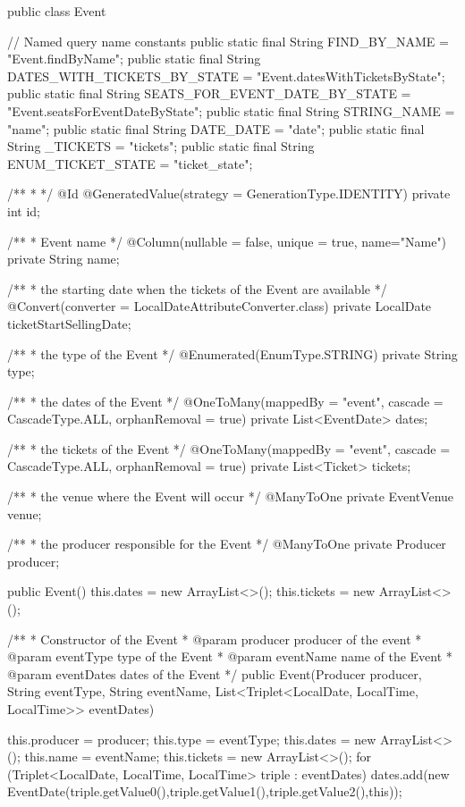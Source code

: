 \begin{prompt}
{{{  public class Event {
  
    // Named query name constants
    public static final String FIND_BY_NAME = "Event.findByName";
    public static final String DATES_WITH_TICKETS_BY_STATE = "Event.datesWithTicketsByState";
    public static final String SEATS_FOR_EVENT_DATE_BY_STATE = "Event.seatsForEventDateByState";
    public static final String STRING_NAME = "name";
    public static final String DATE_DATE = "date";
    public static final String _TICKETS = "tickets";
    public static final String ENUM_TICKET_STATE = "ticket_state";
  
    /**
     * 
     */
    @Id @GeneratedValue(strategy = GenerationType.IDENTITY)
    private int id;
  
    /**
     * Event name
     */
    @Column(nullable = false, unique = true, name="Name")
    private String name;
  
    /**
     * the starting date when the tickets of the Event are available
     */
    @Convert(converter = LocalDateAttributeConverter.class)
    private LocalDate ticketStartSellingDate;
  
    /**
     * the type of the Event
     */
    @Enumerated(EnumType.STRING)
    private String type;
  
    /**
     * the dates of the Event
     */
    @OneToMany(mappedBy = "event", cascade = CascadeType.ALL, orphanRemoval = true)
    private List<EventDate> dates;
  
    /**
     * the tickets of the Event
     */
    @OneToMany(mappedBy = "event", cascade = CascadeType.ALL, orphanRemoval = true)
    private List<Ticket> tickets;
  
    /**
     * the venue where the Event will occur 
     */
    @ManyToOne
    private EventVenue venue;
  
    /**
     * the producer responsible for the Event
     */
    @ManyToOne
    private Producer producer;
  
  
    public Event() {
      this.dates = new ArrayList<>();
      this.tickets = new ArrayList<>();
    }
    
    /**
     * Constructor of the Event
     * @param producer producer of the event
     * @param eventType type of the Event
     * @param eventName name of the Event
     * @param eventDates dates of the Event
     */
    public Event(Producer producer, String eventType, String eventName, List<Triplet<LocalDate, LocalTime, LocalTime>> eventDates) {
  
  
      this.producer = producer;
      this.type = eventType;
      this.dates = new ArrayList<>();
      this.name = eventName;
      this.tickets = new ArrayList<>();
      for (Triplet<LocalDate, LocalTime, LocalTime> triple : eventDates) {
        dates.add(new EventDate(triple.getValue0(),triple.getValue1(),triple.getValue2(),this));
      }
    }
    
}}}}
\end{prompt}
